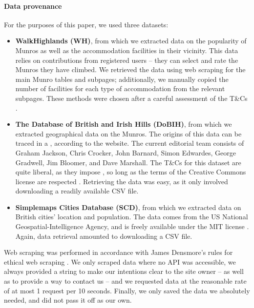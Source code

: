 \documentclass[11pt,a4paper]{article}
\begin{document}
\paragraph{Data provenance}
For the purposes of this paper, we used three datasets:
\begin{itemize}
    \item \textbf{WalkHighlands (WH)}, from which we extracted data on the popularity of Munros as well as the accommodation facilities in their vicinity. This data relies on contributions from registered users – they can select and rate the Munros they have climbed. We retrieved the data using web scraping for the main Munro tables and subpages; additionally, we manually copied the number of facilities for each type of accommodation from the relevant subpages. These methods were chosen after a careful assessment of the T\&Cs \cite{WHTC}.
    \item \textbf{The Database of British and Irish Hills (DoBIH)}, from which we extracted geographical data on the Munros. The origins of this data can be traced in a , according to the website. The current editorial team consists of Graham Jackson, Chris Crocker, John Barnard, Simon Edwardes, George Gradwell, Jim Bloomer, and Dave Marshall. The T\&Cs for this dataset are quite liberal, as they impose , so long as the terms of the Creative Commons license are respected \cite{DoBIHTC}. Retrieving the data was easy, as it only involved downloading a readily available CSV file.
    \item \textbf{Simplemaps Cities Database (SCD)}, from which we extracted data on British cities' location and population. The data comes from the US National Geospatial-Intelligence Agency, and is freely available under the MIT license \cite {SCDBT}. Again, data retrieval amounted to downloading a CSV file.
\end{itemize}

Web scraping was performed in accordance with James Densmore's rules for ethical web scraping \cite{EiWS}. We only scraped data where no API was accessible, we always provided a  string to make our intentions clear to the site owner – as well as to provide a way to contact us – and we requested data at the reasonable rate of at most 1 request per 10 seconds. Finally, we only saved the data we absolutely needed, and did not pass it off as our own.
\end{document}
